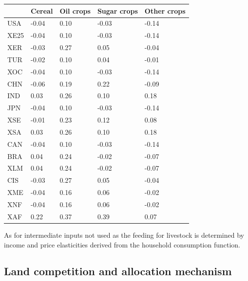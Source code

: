 \documentclass[10pt,a4paper,titlepage,dvipdfmx]{book}
\begin{document}
\begin{tabularx}{\textwidth}{|
p{}|
p{}|
p{}|
p{}|
p{}|} 
\caption{\label{tab:IncElaCro}Income elasticity of crop consumption}\\
\hline 
 & Cereal & Oil crops & Sugar crops & Other crops \\\hline 
USA & -0.04 & 0.10 & -0.03 & -0.14 \\\hline 
XE25 & -0.04 & 0.10 & -0.03 & -0.14 \\\hline 
XER & -0.03 & 0.27 & 0.05 & -0.04 \\\hline 
TUR & -0.02 & 0.10 & 0.04 & -0.01 \\\hline 
XOC & -0.04 & 0.10 & -0.03 & -0.14 \\\hline 
CHN & -0.06 & 0.19 & 0.22 & -0.09 \\\hline 
IND & 0.03 & 0.26 & 0.10 & 0.18 \\\hline 
JPN & -0.04 & 0.10 & -0.03 & -0.14 \\\hline 
XSE & -0.01 & 0.23 & 0.12 & 0.08 \\\hline 
XSA & 0.03 & 0.26 & 0.10 & 0.18 \\\hline 
CAN & -0.04 & 0.10 & -0.03 & -0.14 \\\hline 
BRA & 0.04 & 0.24 & -0.02 & -0.07 \\\hline 
XLM & 0.04 & 0.24 & -0.02 & -0.07 \\\hline 
CIS & -0.03 & 0.27 & 0.05 & -0.04 \\\hline 
XME & -0.04 & 0.16 & 0.06 & -0.02 \\\hline 
XNF & -0.04 & 0.16 & 0.06 & -0.02 \\\hline 
XAF & 0.22 & 0.37 & 0.39 & 0.07 \\\hline 
\end{tabularx}

As for intermediate inputs not used as the feeding for livestock is determined by income and price elasticities derived from the household consumption function.

\subsection{\label{subsec:LanComAlloMec}{Land competition and allocation mechanism}}
\end{document}

